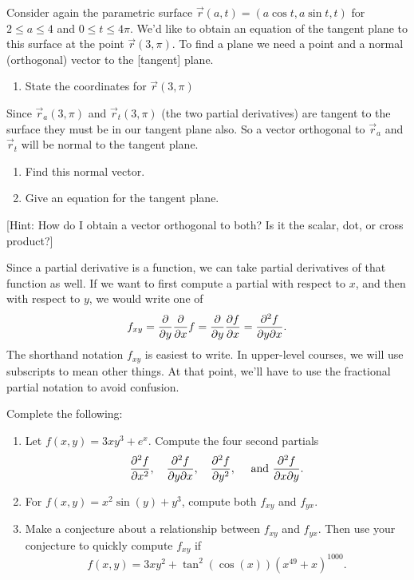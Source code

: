 \begin{problem}
 Consider again the parametric surface $\vec r(a,t) = (a\cos t, a\sin t, t)$ for $2\leq a\leq 4$ and $0\leq t\leq 4\pi$. 
 We'd like to obtain an equation of the tangent plane to this surface at the point $\vec r(3,\pi)$. To find a plane we need a point and a normal (orthogonal) vector to the [tangent] plane.
\begin{enumerate}
	\item State the coordinates for $\vec r (3,\pi)$
\end{enumerate}
Since $\vec r_a (3,\pi)$ and $\vec r_t (3, \pi)$ (the two partial derivatives) are tangent to the surface they must be in our tangent plane also. So a vector orthogonal to $\vec r_a$ and $\vec r_t$ will be normal to the tangent plane.
\begin{enumerate}[resume]
	\item Find this normal vector.
	\item Give an equation for the tangent plane.
\end{enumerate}

 [Hint: How do I obtain a vector orthogonal to both? Is it the scalar, dot, or cross product?]
\end{problem}


Since a partial derivative is a function, we can take partial derivatives of that function as well.  
If we want to first compute a partial with respect to $x$, and then with respect to $y$, we would write one of $$f_{xy}=\displaystyle\frac{\partial}{\partial y}\frac{\partial}{\partial x}f = \frac{\partial}{\partial y}\frac{\partial f}{\partial x} = \frac{\partial^2 f}{\partial y \partial x}.$$
The shorthand notation $f_{xy}$ is easiest to write. In upper-level courses, we will use subscripts to mean other things. At that point, we'll have to use the fractional partial notation to avoid confusion.


\begin{challenge}\label{prob:second partials agree}%
Complete the following:
\begin{enumerate}
 \item Let $f(x,y)=3xy^3+e^{x}.$
Compute the four second partials $$\displaystyle \frac{\partial^2 f}{ \partial x^2},\quad \displaystyle\frac{\partial^2 f}{\partial y \partial x},\quad \displaystyle\frac{\partial^2 f}{\partial y^2}, \quad \text{ and }\displaystyle\frac{\partial^2 f}{\partial x \partial y}.$$
 \item For $f(x,y)=x^2\sin(y)+y^3$, compute both $f_{xy}$ and $f_{yx}$.  
 \item Make a conjecture about a relationship between $f_{xy}$ and $f_{yx}$. Then use your conjecture to quickly compute $f_{xy}$ if $$f(x,y)=3xy^2+\tan^{2}(\cos(x)) (x^{49}+x)^{1000}.$$ 
\end{enumerate}
\end{challenge}

